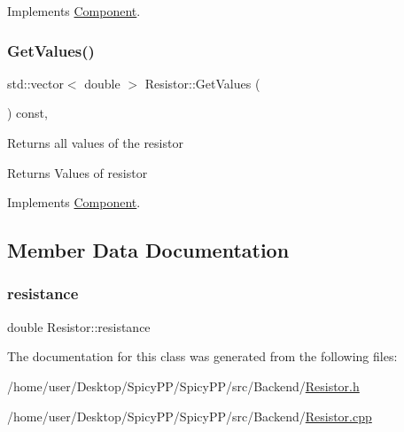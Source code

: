 Implements \hyperlink{classComponent_a833d40a0f50c3c06dcab2e035b758e6f}{Component}.

\mbox{\label{classResistor_ad4d08c34efa99287438aac338d7012d7}} 
\subsubsection{\texorpdfstring{Get\+Values()}{GetValues()}}
{\footnotesize\ttfamily std\+::vector$<$ double $>$ Resistor\+::\+Get\+Values (\begin{DoxyParamCaption}{ }\end{DoxyParamCaption}) const\hspace{0.3cm}{\ttfamily [override]}, {\ttfamily [virtual]}}

Returns all values of the resistor \begin{DoxyReturn}{Returns}
Values of resistor 
\end{DoxyReturn}


Implements \hyperlink{classComponent_a7c6ba16177143bc9945583a9c3df4c89}{Component}.



\subsection{Member Data Documentation}
\mbox{\label{classResistor_ac940c96f396ad2ad276d03c60106ebe4}} 
\subsubsection{\texorpdfstring{resistance}{resistance}}
{\footnotesize\ttfamily double Resistor\+::resistance\hspace{0.3cm}{\ttfamily [private]}}



The documentation for this class was generated from the following files\+:\begin{DoxyCompactItemize}
\item 
/home/user/\+Desktop/\+Spicy\+P\+P/\+Spicy\+P\+P/src/\+Backend/\hyperlink{Resistor_8h}{Resistor.\+h}\item 
/home/user/\+Desktop/\+Spicy\+P\+P/\+Spicy\+P\+P/src/\+Backend/\hyperlink{Resistor_8cpp}{Resistor.\+cpp}\end{DoxyCompactItemize}
